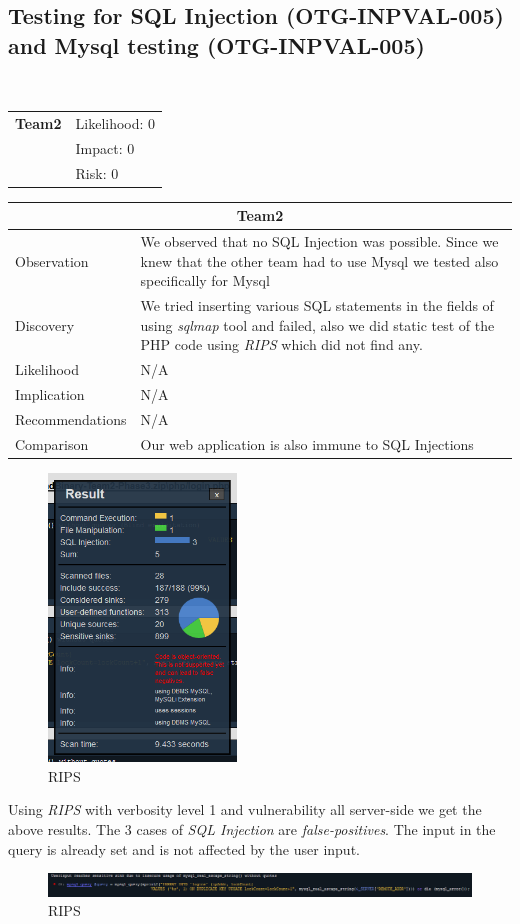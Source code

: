\documentclass[headsepline,footsepline,footinclude=false,oneside,fontsize=11pt,paper=a4,listof=totoc,bibliography=totoc]{scrbook} %
\begin{document}
\pagebreak
\subsection{Testing for SQL Injection (OTG-INPVAL-005) and Mysql testing (OTG-INPVAL-005)}\


\begin{tabular}{cR{12cm}}
	\textbf{Team2} & Likelihood: 0\\& Impact: 0\\& Risk: 0
\end{tabular}

\begin{tabular}{ l|p{11cm}  }
	\hline
	\multicolumn{2}{c}{\textbf{Team2}} \\
	\hline
	Observation   & We observed that no SQL Injection was possible. Since we knew that the other team had
	to use Mysql we tested also specifically for Mysql \\
	Discovery  & We tried inserting various SQL statements in the fields of using \textit{sqlmap} tool and failed, also we did static test of the PHP code using \textit{RIPS} which did not find any.\\
	Likelihood & N/A \\
	Implication    & N/A \\
	Recommendations & N/A \\
	Comparison& Our web application is also immune to SQL Injections \\
	\hline
\end{tabular}
\begin{figure}[ht!]
	\centering
	\includegraphics[width=50mm]{logos/RIPS2.jpg}
	\caption{RIPS \label{overflow}}
\end{figure}
Using \textit{RIPS} with verbosity level 1  and vulnerability all server-side we get the above results.
The 3 cases of \textit{SQL Injection} are \textit{false-positives}. The input in the query is already set and is not affected by the user input.
\begin{figure}[ht!]
	\centering
	\includegraphics[width=150mm]{logos/Injection1.jpg}
	\caption{RIPS \label{overflow}}
\end{figure}
\end{document}
